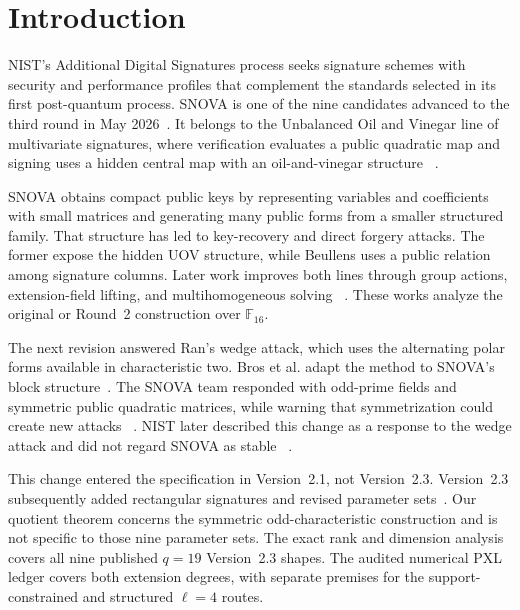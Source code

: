 \documentclass[11pt]{article}
\newcommand{\F}{\mathbb F}
\newcommand{\SNOVA}{\textsf{SNOVA}}
\begin{document}
\section{Introduction}\label{sec:intro}

NIST's Additional Digital Signatures process seeks signature schemes with
security and performance profiles that complement the standards selected in
its first post-quantum process.  \SNOVA{} is one of the nine candidates
advanced to the third round in May 2026~\cite{NISTRound3,NISTIR8610}.  It
belongs to the Unbalanced Oil and Vinegar line of multivariate signatures,
where verification evaluates a public quadratic map and signing uses a
hidden central map with an oil-and-vinegar structure
~\cite{KipnisPatarinGoubin1999,SNOVA23}.

\SNOVA{} obtains compact public keys by representing variables and
coefficients with small matrices and generating many public forms from a
smaller structured family.  That structure has led to key-recovery and direct
forgery attacks.  The former expose the hidden UOV structure, while Beullens
uses a public relation among signature columns.  Later work improves both
lines through group actions, extension-field lifting, and
multihomogeneous solving
~\cite{IkematsuAkiyama2024,LiDing2024,Beullens2024SNOVA,Cabarcas2025SNOVA,FurueEtAl2025,NakamuraEtAl2025}.
These works analyze the original or Round~2 construction over $\F_{16}$.

The next revision answered Ran's wedge attack, which uses the alternating
polar forms available in characteristic two.  Bros et al. adapt the method to
SNOVA's block structure~\cite{Ran2026,BrosEtAl2026SNOVAWedge}.  The \SNOVA{}
team responded with odd-prime fields and symmetric public quadratic matrices,
while warning that symmetrization could create new attacks
~\cite{WangEtAl2025Round2Security}.  NIST later described this change as a
response to the wedge attack and did not regard \SNOVA{} as stable
~\cite{NISTIR8610}.

This change entered the specification in Version~2.1, not Version~2.3.
Version~2.3 subsequently added rectangular signatures and revised parameter
sets~\cite{SNOVA23}.  Our quotient theorem concerns the symmetric
odd-characteristic construction and is not specific to those nine parameter
sets.  The exact rank and dimension analysis covers all nine published
$q=19$ Version~2.3 shapes.  The audited numerical PXL ledger covers both
extension degrees, with separate premises for the support-constrained and
structured $\ell=4$ routes.
\end{document}
